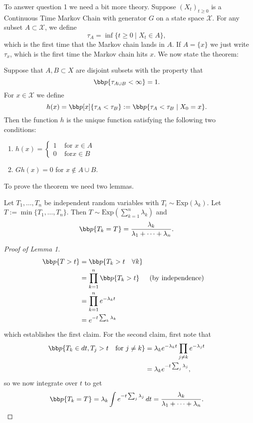 \documentclass[../../../Master/AppliedStochastics.tex]{subfiles}
\begin{document}
To answer question 1 we need a bit more theory. Suppose $(X_t)_{t\geq 0}$ is a 
Continuous Time Markov Chain with generator $G$ on a state space $\mathcal{X}$. 
For any subset $A \subset \mathcal{X}$, we define
\[
	\tau_A = \inf\{t\geq 0 \mid X_t \in A\},
\]
which is the first time that the Markov chain lands in $A$. If $A=\{x\}$ we 
just write $\tau_x$, which is the first time the Markov chain hits $x$. 
We now state the theorem:


\begin{theorem}
Suppose that $A,B\subset X$ are disjoint subsets with the property that 
\[
	\bb p\{ \tau_{A\cup B} <\infty\} = 1.
\]
For $x\in \mathcal{X}$ we define 
\[
	h(x) = \bb p[x] \{\tau_A <\tau_B\} := \bb p\{\tau_A<\tau_B \mid X_0 = x\}.
\]
Then the function $h$ is the unique function satisfying the following two 
conditions:
\begin{enumerate}
	\item $
		h(x) = \begin{cases}
			1 & \text{ for } x \in A\\
			0 & \text{ for} x\in B
		\end{cases}
	$
	\item $Gh(x) = 0$ for $x\notin A\cup B$. 
\end{enumerate}
\end{theorem}

To prove the theorem we need two lemmas.
\begin{lemma}
Let $T_1,\dots, T_n$ be independent random variables with $T_i\sim 
\text{Exp}(\lambda_k)$. Let $T := \min\{T_1,\dots,T_n\}$. Then $T\sim 
\text{Exp}\left(\sum_{k=1}^n \lambda_k\right)$ and 
\[
	\bb p\{T_k = T\} = \frac{\lambda_k}{\lambda_1+\dots+\lambda_n}.
\]
\end{lemma}

\begin{proof}[Proof of Lemma 1]
	\begin{align*}
		\bb p\{T >t \} &= \bb p\{T_k > t \quad \forall k\}\\
		&= \prod_{k=1}^n \bb p\{T_k > t\} &&\text{(by independence)}\\
		&= \prod_{k=1}^n e^{-\lambda_k t} \\
		&= e^{-t \sum_{k}\lambda_k}
	\end{align*}
	which establishes the first claim. For the second claim, first note that
	\begin{align*}
		\bb p\{ T_k \in dt, T_j > t \quad \text{for } j\neq k\} &= \lambda_k 
		e^{-\lambda_k t} \prod_{j\neq k} e^{-\lambda_j t}\\
		&= \lambda_k e^{-t \sum_j \lambda_j},
	\end{align*}
	so we now integrate over $t$ to get
	\[
		\bb p\{T_k = T\} = \lambda_k \int e^{-t \sum_j \lambda_j}\,dt = 
		\frac{\lambda_k}{\lambda_1+\dots + \lambda_n}.
	\]
\end{proof}

%



%
\end{document}
